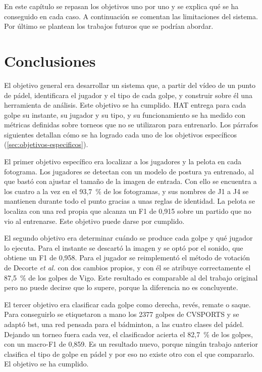 
En este capítulo se repasan los objetivos uno por uno y se explica qué se ha conseguido en cada caso.
A continuación se comentan las limitaciones del sistema.
Por último se plantean los trabajos futuros que se podrían abordar.

\section{Conclusiones}
\label{sec:conclusiones}

El objetivo general era desarrollar un sistema que, a partir del vídeo de un punto de pádel, identificara el jugador y el tipo de cada golpe, y construir sobre él una herramienta de análisis.
Este objetivo se ha cumplido.
HAT entrega para cada golpe su instante, su jugador y su tipo, y su funcionamiento se ha medido con métricas definidas sobre torneos que no se utilizaron para entrenarlo.
Los párrafos siguientes detallan cómo se ha logrado cada uno de los objetivos específicos (\cref{sec:objetivos-especificos}).

El primer objetivo específico era localizar a los jugadores y la pelota en cada fotograma.
Los jugadores se detectan con un modelo de postura ya entrenado, al que bastó con ajustar el tamaño de la imagen de entrada.
Con ello se encuentra a los cuatro a la vez en el 93,7~\% de los fotogramas, y sus nombres de J1 a J4 se mantienen durante todo el punto gracias a unas reglas de identidad.
La pelota se localiza con una red propia que alcanza un F1 de 0,915 sobre un partido que no vio al entrenarse.
Este objetivo puede darse por cumplido.

El segundo objetivo era determinar cuándo se produce cada golpe y qué jugador lo ejecuta.
Para el instante se descartó la imagen y se optó por el sonido, que obtiene un F1 de 0,958.
Para el jugador se reimplementó el método de votación de Decorte \textit{et al.} con dos cambios propios, y con él se atribuye correctamente el 87,5~\% de los golpes de Vigo.
Este resultado es comparable al del trabajo original pero no puede decirse que lo supere, porque la diferencia no es concluyente.

El tercer objetivo era clasificar cada golpe como derecha, revés, remate o saque.
Para conseguirlo se etiquetaron a mano los 2377 golpes de CVSPORTS y se adaptó \acs{bst}, una red pensada para el bádminton, a las cuatro clases del pádel.
Dejando un torneo fuera cada vez, el clasificador acierta el 82,7~\% de los golpes, con un macro-F1 de 0,859.
Es un resultado nuevo, porque ningún trabajo anterior clasifica el tipo de golpe en pádel y por eso no existe otro con el que compararlo.
El objetivo se ha cumplido.

